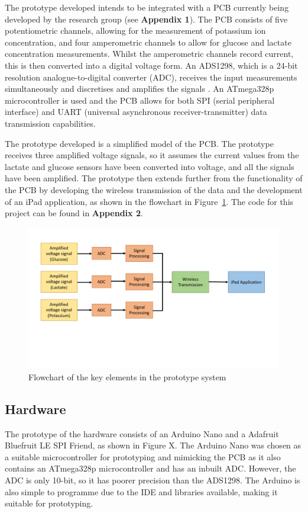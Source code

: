 The prototype developed intends to be integrated with a PCB currently being developed by the research group (see \textbf{Appendix 1}). The PCB consists of five potentiometric channels, allowing for the measurement of potassium ion concentration, and four amperometric channels to allow for glucose and lactate concentration measurements. Whilst the amperometric channels record current, this is then converted into a digital voltage form. An ADS1298, which is a 24-bit resolution analogue-to-digital converter (ADC), receives the input measurements simultaneously and discretises and amplifies the signals \cite{TexasInstruments2010}. An ATmega328p microcontroller is used and the PCB allows for both SPI (serial peripheral interface) and UART (universal asynchronous receiver-transmitter) data transmission capabilities.

The prototype developed is a simplified model of the PCB. The prototype receives three amplified voltage signals, so it assumes the current values from the lactate and glucose sensors have been converted into voltage, and all the signals have been amplified. The prototype then extends further from the functionality of the PCB by developing the wireless transmission of the data and the development of an iPad application, as shown in the flowchart in Figure~\ref{fig: flowchart}. The code for this project can be found in  \textbf{Appendix 2}.

\begin{figure}[H]
\centering
\includegraphics[trim={0cm 6cm 0.5cm  2cm}, clip, width=1\textwidth]{./figures/Flowchart.pdf}
\captionsetup{justification=centering}
\caption{Flowchart of the key elements in the prototype system}
\label{fig: flowchart}
\end{figure}



\subsection{Hardware}
The prototype of the hardware consists of an Arduino Nano and a Adafruit Bluefruit LE SPI Friend, as shown in Figure X. The Arduino Nano was chosen as a suitable microcontroller for prototyping and mimicking the PCB as it also contains an ATmega328p microcontroller and has an inbuilt ADC. However, the ADC is only 10-bit, so it has poorer precision than the ADS1298. The Arduino is also simple to programme due to the IDE and libraries available, making it suitable for prototyping.

